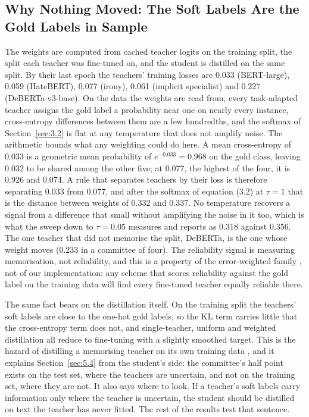 \subsection{Why Nothing Moved: The Soft Labels Are the Gold Labels in Sample}
\label{sec:5.6}
The weights are computed from cached teacher logits on the training split, the split each teacher
was fine-tuned on, and the student is distilled on the same split. By their last epoch the teachers'
training losses are 0.033 (BERT-large), 0.059 (HateBERT), 0.077 (irony), 0.061 (implicit specialist)
and 0.227 (DeBERTa-v3-base). On the data the weights are read from, every task-adapted teacher
assigns the gold label a probability near one on nearly every instance, cross-entropy differences
between them are a few hundredths, and the softmax of Section~\ref{sec:3.2} is flat at any
temperature that does not amplify noise. The arithmetic bounds what any weighting could do here. A
mean cross-entropy of 0.033 is a geometric mean probability of $e^{-0.033} = 0.968$ on the gold
class, leaving 0.032 to be shared among the other five; at 0.077, the highest of the four, it is
0.926 and 0.074. A rule that separates teachers by their loss is therefore separating 0.033 from
0.077, and after the softmax of equation (3.2) at $\tau = 1$ that is the distance between weights of
0.332 and 0.337. No temperature recovers a signal from a difference that small without amplifying
the noise in it too, which is what the sweep down to $\tau = 0.05$ measures and reports as 0.318
against 0.356. The one teacher that did not memorise the split, DeBERTa, is the one whose weight
moves (0.233 in a committee of four). The reliability signal is measuring memorisation, not
reliability, and this is a property of the error-weighted family \cite{wu2021one,
zhang2022confidence}, not of our implementation: any scheme that scores reliability against the gold
label on the training data will find every fine-tuned teacher equally reliable there.

The same fact bears on the distillation itself. On the training split the teachers' soft labels are
close to the one-hot gold labels, so the KL term carries little that the cross-entropy term does
not, and single-teacher, uniform and weighted distillation all reduce to fine-tuning with a slightly
smoothed target. This is the hazard of distilling a memorising teacher on its own training data
\cite{stanton2021does, beyer2022knowledge}, and it explains Section~\ref{sec:5.4} from the student's
side: the committee's half point exists on the test set, where the teachers are uncertain, and not
on the training set, where they are not. It also says where to look. If a teacher's soft labels
carry information only where the teacher is uncertain, the student should be distilled on text the
teacher has never fitted. The rest of the results test that sentence.
